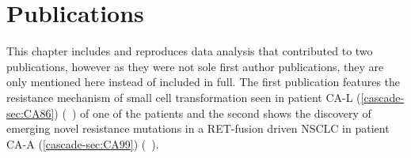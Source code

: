 \section{Publications}
\label{cascade-sec:publication}

This chapter includes and reproduces data analysis that contributed to two publications, however as they were not sole first author publications, they are only mentioned here instead of included in full. 
The first publication features the resistance mechanism of small cell transformation seen in patient CA-L (\autoref{cascade-sec:CA86}) (\textit{}~\textcite{Burr2019}) of one of the patients and the second shows the discovery of emerging novel resistance mutations in a RET-fusion driven NSCLC in patient CA-A (\autoref{cascade-sec:CA99}) (\textit{}~\textcite{Solomon2020}).
